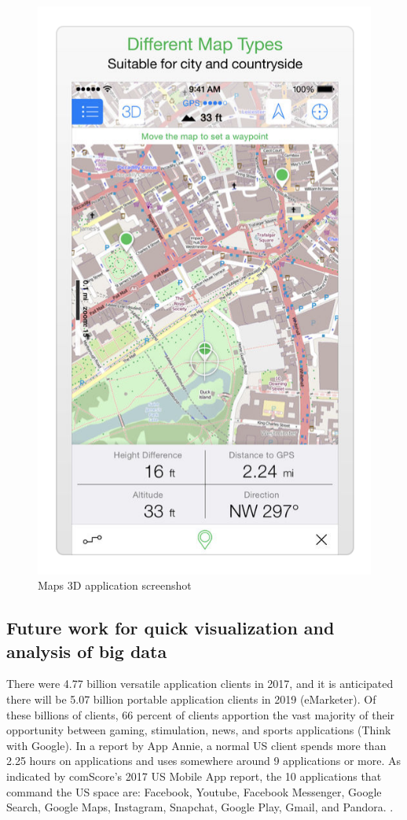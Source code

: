 \begin{itemize}
    \begin{figure}[H]
            \centering
            \includegraphics[width=0.25\linewidth]{figures/ch1/map_3d.png}
            \caption{\label{fig:map_3d} Maps 3D application screenshot \cite{Spatial_Agent}}
    \end{figure}
\end{itemize}

  
\subsection{Future work for quick visualization and analysis of big data}

There were 4.77 billion versatile application clients in 2017, and it is anticipated there will be 5.07 billion portable application clients in 2019 (eMarketer). Of these billions of clients, 66 percent of clients apportion the vast majority of their opportunity between gaming, stimulation, news, and sports applications (Think with Google). In a report by App Annie\cite{AppAnnie}, a normal US client spends more than 2.25 hours on applications and uses somewhere around 9 applications or more. As indicated by comScore's 2017 US Mobile App report, the 10 applications that command the US space are: Facebook, Youtube, Facebook Messenger, Google Search, Google Maps, Instagram, Snapchat, Google Play, Gmail, and Pandora. \cite{eBiz_solutions}.

